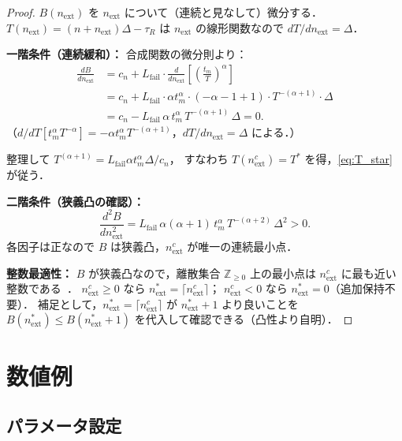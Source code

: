 \documentclass[12pt,a4paper]{article}
\theoremstyle{plain}
\theoremstyle{definition}
\theoremstyle{remark}
\newcommand{\Z}{\mathbb{Z}}
\begin{document}
\begin{proof}
$B(n_{\mathrm{ext}})$ を $n_{\mathrm{ext}}$ について（連続と見なして）微分する．
$T(n_{\mathrm{ext}})=(n+n_{\mathrm{ext}})\Delta-\tau_R$ は $n_{\mathrm{ext}}$ の線形関数なので
$dT/dn_{\mathrm{ext}}=\Delta$．

\textbf{一階条件（連続緩和）：}
合成関数の微分則より：
\begin{align*}
\frac{dB}{dn_{\mathrm{ext}}}
&=c_n+L_{\mathrm{fail}}\cdot\frac{d}{dn_{\mathrm{ext}}}\!\left[\left(\frac{t_m}{T}\right)^\alpha\right]\\
&=c_n+L_{\mathrm{fail}}\cdot\alpha t_m^\alpha\cdot(-\alpha-1+1)\cdot T^{-(\alpha+1)}\cdot\Delta\\
&=c_n-L_{\mathrm{fail}}\,\alpha\,t_m^\alpha\,T^{-(\alpha+1)}\,\Delta=0.
\end{align*}
（$d/dT[t_m^\alpha T^{-\alpha}]=-\alpha t_m^\alpha T^{-(\alpha+1)}$，$dT/dn_{\mathrm{ext}}=\Delta$ による．）

整理して $T^{(\alpha+1)}=L_{\mathrm{fail}}\alpha t_m^\alpha\Delta/c_n$，
すなわち $T(n_{\mathrm{ext}}^c)=T^*$ を得，\eqref{eq:T_star} が従う．

\textbf{二階条件（狭義凸の確認）：}
\[
\frac{d^2B}{dn_{\mathrm{ext}}^2}
=L_{\mathrm{fail}}\,\alpha(\alpha+1)\,t_m^\alpha\,T^{-(\alpha+2)}\,\Delta^2>0.
\]
各因子は正なので $B$ は狭義凸，$n_{\mathrm{ext}}^c$ が唯一の連続最小点．

\textbf{整数最適性：}
$B$ が狭義凸なので，離散集合 $\Z_{\ge0}$ 上の最小点は $n_{\mathrm{ext}}^c$ に最も近い整数である~\cite{rockafellar1970,boyd2004}．
$n_{\mathrm{ext}}^c\ge0$ なら $n_{\mathrm{ext}}^*=\lceil n_{\mathrm{ext}}^c\rceil$；
$n_{\mathrm{ext}}^c<0$ なら $n_{\mathrm{ext}}^*=0$（追加保持不要）．
補足として，$n_{\mathrm{ext}}^*=\lceil n_{\mathrm{ext}}^c\rceil$ が $n_{\mathrm{ext}}^*+1$ より良いことを
$B(n_{\mathrm{ext}}^*)\le B(n_{\mathrm{ext}}^*+1)$ を代入して確認できる（凸性より自明）．
\end{proof}

\section{数値例}
\label{sec:numerical}

\subsection{パラメータ設定}
\end{document}
